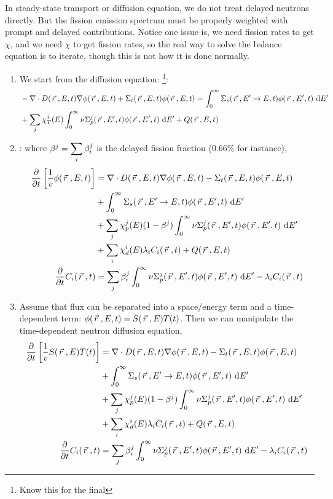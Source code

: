 \documentclass{school-22.211-notes}
\begin{document}
\clearpage
{}
In steady-state transport or diffusion equation, we do not treat delayed neutrons directly. But the fission emission spectrum must be properly weighted with prompt and delayed contributions. Notice one issue is, we need fission rates to get $\chi$, and we need $\chi$ to get fission rates, so the real way to solve the balance equation is to iterate, though this is not how it is done normally.
\begin{enumerate}
\item We start from the diffusion equation: \footnote{Know this for the final}: 
\begin{align}
& - \nabla \cdot D(\left.\vec{r}\right., E, t) \nabla \phi(\left.\vec{r}\right., E, t) + \Sigma_t (\left.\vec{r}\right., E, t) \phi(\left.\vec{r}\right., E, t) = \int_0^{\infty} \Sigma_s (\left.\vec{r}\right., E'\to E, t) \phi(\left.\vec{r}\right., E', t) \mbox{ }\mathrm{d} E' \\
&+ \displaystyle\sum_j \chi_T^j (E) \int_0^{\infty} \nu \Sigma_p^j (\left.\vec{r}\right., E', t) \phi(\left.\vec{r}\right., E', t) \mbox{ }\mathrm{d} E' + Q(\left.\vec{r}\right., E, t) 
\end{align}

\item {}: where $\beta^j = \displaystyle\sum_i \beta_i^j$ is the delayed fission fraction (0.66\% for instance), 
\begin{align}
\frac{\partial}{\partial t} \left[ \frac{1}{v} \phi(\left.\vec{r}\right., E, t) \right] &= \nabla \cdot D(\left.\vec{r}\right., E, t) \nabla \phi(\left.\vec{r}\right., E, t) - \Sigma_t (\left.\vec{r}\right., E, t) \phi(\left.\vec{r}\right., E, t) \\
& + \int_0^{\infty} \Sigma_s (\left.\vec{r}\right., E'\to E, t) \phi(\left.\vec{r}\right., E', t) \mbox{ }\mathrm{d} E' \\
&+ \displaystyle\sum_j \chi_p^j (E) (1-\beta^j) \int_0^{\infty} \nu \Sigma_p^j (\left.\vec{r}\right., E', t) \phi(\left.\vec{r}\right., E', t) \mbox{ }\mathrm{d} E' \\
&+ \displaystyle\sum_i \chi_d^i (E) \lambda_i C_i (\left.\vec{r}\right., t) + Q(\left.\vec{r}\right., E, t)\\
\frac{\partial}{\partial t} C_i (\left.\vec{r}\right., t) &= \displaystyle\sum_j \beta_i^j \int_0^{\infty} \nu \Sigma_p^j (\left.\vec{r}\right., E', t) \phi(\left.\vec{r}\right., E', t) \mbox{ }\mathrm{d} E' - \lambda_i C_i (\left.\vec{r}\right., t) 
\end{align}

\item Assume that flux can be separated into a space/energy term and a time-dependent term: $\phi(\left.\vec{r}\right., E, t) = S(\left.\vec{r}\right., E) T(t)$. Then we can manipulate the time-dependent neutron diffusion equation, 
\begin{align}
\frac{\partial}{\partial t} \left[ \frac{1}{v} S(\left.\vec{r}\right., E) T(t) \right] &= \nabla \cdot D(\left.\vec{r}\right., E, t) \nabla \phi(\left.\vec{r}\right., E, t) - \Sigma_t (\left.\vec{r}\right., E, t) \phi(\left.\vec{r}\right., E, t) \\
& + \int_0^{\infty} \Sigma_s (\left.\vec{r}\right., E'\to E, t) \phi(\left.\vec{r}\right., E', t) \mbox{ }\mathrm{d} E' \\
&+ \displaystyle\sum_j \chi_p^j (E) (1-\beta^j) \int_0^{\infty} \nu \Sigma_p^j (\left.\vec{r}\right., E', t) \phi(\left.\vec{r}\right., E', t) \mbox{ }\mathrm{d} E' \\
&+ \displaystyle\sum_i \chi_d^i (E) \lambda_i C_i (\left.\vec{r}\right., t) + Q(\left.\vec{r}\right., E, t)\\
\frac{\partial}{\partial t} C_i (\left.\vec{r}\right., t) &= \displaystyle\sum_j \beta_i^j \int_0^{\infty} \nu \Sigma_p^j (\left.\vec{r}\right., E', t) \phi(\left.\vec{r}\right., E', t) \mbox{ }\mathrm{d} E' - \lambda_i C_i (\left.\vec{r}\right., t) 
\end{align}


\end{enumerate}
\end{document}
